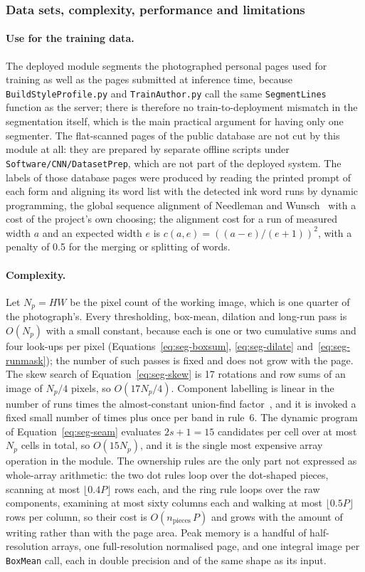 \subsubsection{Data sets, complexity, performance and limitations}

\paragraph{Use for the training data.}
The deployed module segments the photographed personal pages used for training as well as the pages submitted at inference time, because \texttt{BuildStyleProfile.py} and \texttt{TrainAuthor.py} call the same \texttt{SegmentLines} function as the server; there is therefore no train-to-deployment mismatch in the segmentation itself, which is the main practical argument for having only one segmenter.
The flat-scanned pages of the public database are not cut by this module at all: they are prepared by separate offline scripts under \texttt{Software/CNN/DatasetPrep}, which are not part of the deployed system.
The labels of those database pages were produced by reading the printed prompt of each form and aligning its word list with the detected ink word runs by dynamic programming, the global sequence alignment of Needleman and Wunsch~\cite{needleman1970} with a cost of the project's own choosing; the alignment cost for a run of measured width $a$ and an expected width $e$ is $c(a,e)=((a-e)/(e+1))^2$, with a penalty of 0.5 for the merging or splitting of words.

\paragraph{Complexity.}
Let $N_p=HW$ be the pixel count of the working image, which is one quarter of the photograph's.
Every thresholding, box-mean, dilation and long-run pass is $O(N_p)$ with a small constant, because each is one or two cumulative sums and four look-ups per pixel (Equations~\ref{eq:seg-boxsum}, \ref{eq:seg-dilate} and~\ref{eq:seg-runmask}); the number of such passes is fixed and does not grow with the page.
The skew search of Equation~\ref{eq:seg-skew} is 17 rotations and row sums of an image of $N_p/4$ pixels, so $O(17N_p/4)$.
Component labelling is linear in the number of runs times the almost-constant union-find factor~\cite{tarjan1975}, and it is invoked a fixed small number of times plus once per band in rule~6.
The dynamic program of Equation~\ref{eq:seg-seam} evaluates $2s+1=15$ candidates per cell over at most $N_p$ cells in total, so $O(15N_p)$, and it is the single most expensive array operation in the module.
The ownership rules are the only part not expressed as whole-array arithmetic: the two dot rules loop over the dot-shaped pieces, scanning at most $\lfloor0.4P\rfloor$ rows each, and the ring rule loops over the raw components, examining at most sixty columns each and walking at most $\lfloor0.5P\rfloor$ rows per column, so their cost is $O(n_{\mathrm{pieces}}\,P)$ and grows with the amount of writing rather than with the page area.
Peak memory is a handful of half-resolution arrays, one full-resolution normalised page, and one integral image per \texttt{BoxMean} call, each in double precision and of the same shape as its input.


